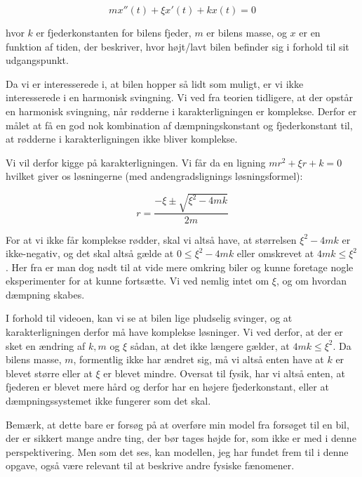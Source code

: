 $$mx''(t)+\xi x'(t) + k x(t) = 0$$

hvor $k$ er fjederkonstanten for bilens fjeder, $m$ er bilens masse, og $x$ er en funktion af tiden, der beskriver, hvor højt/lavt bilen befinder sig i forhold til sit udgangspunkt.

Da vi er interesserede i, at bilen hopper så lidt som muligt, er vi ikke interesserede i en harmonisk svingning. 
Vi ved fra teorien tidligere, at der opstår en harmonisk svingning, når rødderne i karakterligningen er komplekse. 
Derfor er målet at få en god nok kombination af dæmpningskonstant og fjederkonstant til, at rødderne i karakterligningen ikke bliver komplekse. 

Vi vil derfor kigge på karakterligningen. 
Vi får da en ligning $mr^2 + \xi r + k = 0$ hvilket giver os løsningerne (med andengradslignings løsningsformel):

$$r = \dfrac{-\xi \pm \sqrt{\xi ^2 - 4mk}}{2m}$$

For at vi ikke får komplekse rødder, skal vi altså have, at størrelsen $\xi ^2 -4mk$ er ikke-negativ, og det skal altså gælde at $0 \leq \xi ^2 -4mk $ eller omskrevet at $4mk \leq \xi ^2 $.
Her fra er man dog nødt til at vide mere omkring biler og kunne foretage nogle eksperimenter for at kunne fortsætte. 
Vi ved nemlig intet om $\xi$, og om hvordan dæmpning skabes. 

I forhold til videoen, kan vi se at bilen lige pludselig svinger, og at karakterligningen derfor må have komplekse løsninger.
Vi ved derfor, at der er sket en ændring af $k,m$ og $\xi$ sådan, at det ikke længere gælder, at $4mk \leq \xi ^2 $.
Da bilens masse, $m$, formentlig ikke har ændret sig, må vi altså enten have at $k$ er blevet større eller at $\xi$ er blevet mindre. 
Oversat til fysik, har vi altså enten, at fjederen er blevet mere hård og derfor har en højere fjederkonstant, eller at dæmpningssystemet ikke fungerer som det skal.

\vspace{0.75cm}

Bemærk, at dette bare er forsøg på at overføre min model fra forsøget til en bil, der er sikkert mange andre ting, der bør tages højde for, som ikke er med i denne perspektivering.
Men som det ses, kan modellen, jeg har fundet frem til i denne opgave, også være relevant til at beskrive andre fysiske fænomener.


